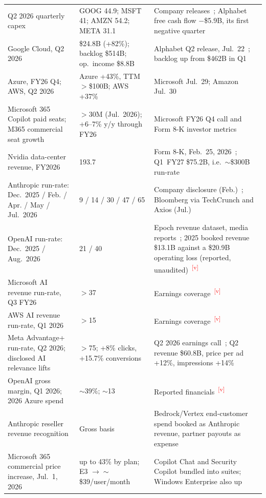 \documentclass[11pt,letterpaper]{article}
\newcommand{\verify}{\textsuperscript{\textcolor{red}{[v]}}}
\begin{document}
\begin{xltabular}{\textwidth}{L{4.3cm}L{2.7cm}X}
Q2 2026 quarterly capex & GOOG 44.9; MSFT 41; AMZN 54.2; META 31.1 & Company releases~\cite{ref:futurex_q2}; Alphabet free cash flow $-$\$5.9B, its first negative quarter \\
Google Cloud, Q2 2026 & \$24.8B (+82\%); backlog \$514B; op.\ income \$8.8B & Alphabet Q2 release, Jul.~22~\cite{ref:alphabet_q2_2026}; backlog up from \$462B in Q1 \\
Azure, FY26 Q4; AWS, Q2 2026 & Azure +43\%, TTM $>$\$100B; AWS +37\% & Microsoft Jul.~29; Amazon Jul.~30~\cite{ref:q2_scorecard,ref:directions_msft} \\
Microsoft 365 Copilot paid seats; M365 commercial seat growth & $>$30M (Jul.~2026); +6--7\% y/y through FY26 & Microsoft FY26 Q4 call and Form 8-K investor metrics~\cite{ref:q2_scorecard,ref:msft_8k_fy27} \\
Nvidia data-center revenue, FY2026 & 193.7 & Form 8-K, Feb.~25, 2026~\cite{ref:nvda_fy26}; Q1~FY27 \$75.2B, i.e.\ $\sim$\$300B run-rate~\cite{ref:nvda_q1fy27} \\
Anthropic run-rate: Dec.~2025 / Feb. / Apr. / May / Jul.~2026 & 9 / 14 / 30 / 47 / 65 & Company disclosure (Feb.)~\cite{ref:anthropic_seriesg}; Bloomberg via TechCrunch and Axios (Jul.)~\cite{ref:techcrunch_anthropic,ref:axios_anthropic} \\
OpenAI run-rate: Dec.~2025 / Aug.~2026 & 21 / 40 & Epoch revenue dataset, media reports~\cite{ref:epoch_revenue}; 2025 booked revenue \$13.1B against a \$20.9B operating loss (reported, unaudited)~\cite{ref:valueadd_openai}\verify \\
Microsoft AI revenue run-rate, Q3 FY26 & $>$37 & Earnings coverage~\cite{ref:yahoo2026}\verify \\
AWS AI revenue run-rate, Q1 2026 & $>$15 & Earnings coverage~\cite{ref:traderinsights2026}\verify \\
Meta Advantage+ run-rate, Q2 2026; disclosed AI relevance lifts & $>$75; +8\% clicks, +15.7\% conversions & Q2 2026 earnings call~\cite{ref:meta_q2_2026}; Q2 revenue \$60.8B, price per ad +12\%, impressions +14\%~\cite{ref:meta_q2_2026b} \\
OpenAI gross margin, Q1 2026; 2026 Azure spend & $\sim$39\%; $\sim$13 & Reported financials~\cite{ref:valueadd_openai}\verify \\
Anthropic reseller revenue recognition & Gross basis & Bedrock/Vertex end-customer spend booked as Anthropic revenue, partner payouts as expense~\cite{ref:sacra_anthropic} \\
Microsoft 365 commercial price increase, Jul.~1, 2026 & up to 43\% by plan; E3 $\to\sim$\$39/user/month & Copilot Chat and Security Copilot bundled into suites; Windows Enterprise also up~\cite{ref:m365_price_wl,ref:m365_price_uscloud} \\

\end{xltabular}
\end{document}

